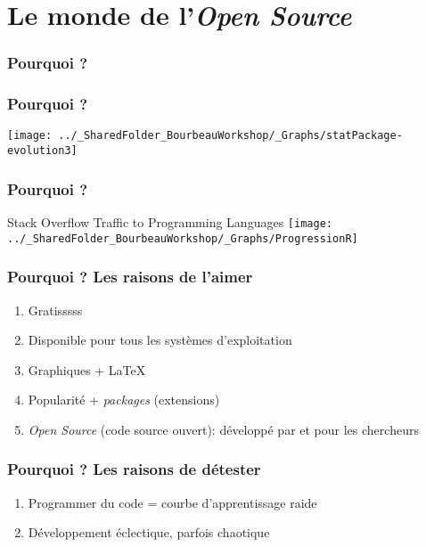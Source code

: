\documentclass{beamer}
\begin{document}
\section{Le monde \vspace{0.3cm} de l'\emph{Open Source}}

    \begin{frame}
        \frametitle{Pourquoi \R?}  \vspace{1.2cm}
    \end{frame}

    \begin{frame}
        \frametitle{Pourquoi \R?}  \vspace{1.2cm}
        \begin{center}
            \texttt{[image: ../\_SharedFolder\_BourbeauWorkshop/\_Graphs/statPackage-evolution3]}
        \end{center} 
    \end{frame}
    
     \begin{frame}
        \frametitle{Pourquoi \R?}  \vspace{1.2cm}
        \begin{center}
            Stack Overflow Traffic to Programming Languages
            \texttt{[image: ../\_SharedFolder\_BourbeauWorkshop/\_Graphs/ProgressionR]}
        \end{center} 
    \end{frame}

   \begin{frame}
        \frametitle{Pourquoi \R? Les raisons de l'aimer}
        \begin{enumerate}
            \item{Gratisssss}
            \item{Disponible pour tous les systèmes d'exploitation}
            \item{Graphiques + \LaTeX}
            \item{Popularité + \emph{packages} (extensions)}
            \item{\emph{Open Source} (code source ouvert): développé par et pour les chercheurs}
        \end{enumerate}
    \end{frame}
    
    \begin{frame}
        \frametitle{Pourquoi \R? Les raisons de détester}
        \begin{enumerate}
            \item{Programmer du code = courbe d'apprentissage raide}
            \item{Développement éclectique, parfois chaotique}
        \end{enumerate}
    \end{frame}
    
\end{document}
